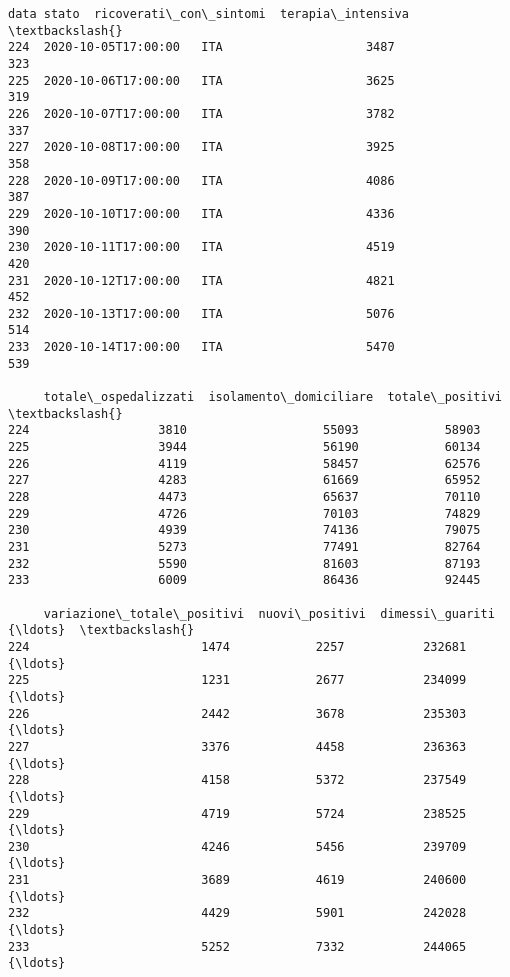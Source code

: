 \documentclass[11pt]{article}
\makeatletter
\newcommand{\boxspacing}{\kern\kvtcb@left@rule\kern\kvtcb@boxsep}
\newcommand{\prompt}[4]{
        \ttfamily\llap{{\color{#2}[#3]:\hspace{3pt}#4}}\vspace{-\baselineskip}
    }
\makeatother
\begin{document}
            \begin{tcolorbox}[breakable, size=fbox, boxrule=.5pt, pad at break*=1mm, opacityfill=0]
\prompt{Out}{outcolor}{8}{\boxspacing}
\begin{Verbatim}[commandchars=\\\{\}]
                    data stato  ricoverati\_con\_sintomi  terapia\_intensiva  \textbackslash{}
224  2020-10-05T17:00:00   ITA                    3487                323
225  2020-10-06T17:00:00   ITA                    3625                319
226  2020-10-07T17:00:00   ITA                    3782                337
227  2020-10-08T17:00:00   ITA                    3925                358
228  2020-10-09T17:00:00   ITA                    4086                387
229  2020-10-10T17:00:00   ITA                    4336                390
230  2020-10-11T17:00:00   ITA                    4519                420
231  2020-10-12T17:00:00   ITA                    4821                452
232  2020-10-13T17:00:00   ITA                    5076                514
233  2020-10-14T17:00:00   ITA                    5470                539

     totale\_ospedalizzati  isolamento\_domiciliare  totale\_positivi  \textbackslash{}
224                  3810                   55093            58903
225                  3944                   56190            60134
226                  4119                   58457            62576
227                  4283                   61669            65952
228                  4473                   65637            70110
229                  4726                   70103            74829
230                  4939                   74136            79075
231                  5273                   77491            82764
232                  5590                   81603            87193
233                  6009                   86436            92445

     variazione\_totale\_positivi  nuovi\_positivi  dimessi\_guariti  {\ldots}  \textbackslash{}
224                        1474            2257           232681  {\ldots}
225                        1231            2677           234099  {\ldots}
226                        2442            3678           235303  {\ldots}
227                        3376            4458           236363  {\ldots}
228                        4158            5372           237549  {\ldots}
229                        4719            5724           238525  {\ldots}
230                        4246            5456           239709  {\ldots}
231                        3689            4619           240600  {\ldots}
232                        4429            5901           242028  {\ldots}
233                        5252            7332           244065  {\ldots}


\end{Verbatim}
\end{tcolorbox}
\end{document}
